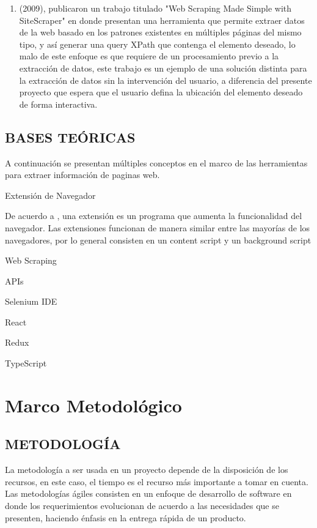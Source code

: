 \documentclass[12pt]{report}
\begin{document}
\begin{enumerate}
\item \citeauthor{penman2009web} (2009), publicaron un trabajo titulado "Web Scraping Made Simple with SiteScraper" en donde presentan una herramienta que permite extraer datos de la web basado en los patrones existentes en múltiples páginas del mismo tipo, y así generar una query XPath que contenga el elemento deseado, lo malo de este enfoque es que requiere de un procesamiento previo a la extracción de datos, este trabajo es un ejemplo de una solución distinta para la extracción de datos sin la intervención del usuario, a diferencia del presente proyecto que espera que el usuario defina la ubicación del elemento deseado de forma interactiva.

\end{enumerate}

\break

\section[Bases Teóricas]{BASES TEÓRICAS}

A continuación se presentan múltiples conceptos en el marco de las herramientas para extraer información de paginas web.

Extensión de Navegador

De acuerdo a \cite{md2022extensions}, una extensión es un programa que aumenta la funcionalidad del navegador. Las extensiones funcionan de manera similar entre las mayorías de los navegadores, por lo general consisten en un content script y un background script

Web Scraping

APIs

Selenium IDE

React

Redux

TypeScript


\chapter{Marco Metodológico}

\section[Metodología]{METODOLOGÍA}

La metodología a ser usada en un proyecto depende de la disposición de los recursos, en este caso, el tiempo es el recurso más importante a tomar en cuenta. Las metodologías ágiles consisten en un enfoque de desarrollo de software en donde los requerimientos evolucionan de acuerdo a las necesidades que se presenten, haciendo énfasis en la entrega rápida de un producto.
\end{document}

